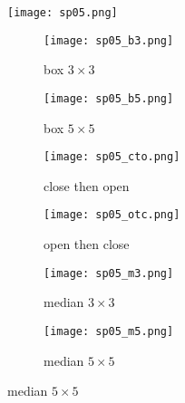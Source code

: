 \documentclass{article}
\begin{document}
\begin{figure}[ht]
    \centering
    \texttt{[image: sp05.png]}
    \caption{salt and pepper 0.05}
    \label{fig:top_image}

    \begin{subfigure}{0.3\textwidth}
        \texttt{[image: sp05\_b3.png]}
        \caption{box $3 \times 3$}
        \label{fig:sub1}
    \end{subfigure}
    \begin{subfigure}{0.3\textwidth}
        \texttt{[image: sp05\_b5.png]}
        \caption{box $5 \times 5$}
        \label{fig:sub2}
    \end{subfigure}

    \begin{subfigure}{0.3\textwidth}
        \texttt{[image: sp05\_cto.png]}
        \caption{close then open}
        \label{fig:sub3}
    \end{subfigure}%
    \begin{subfigure}{0.3\textwidth}
        \texttt{[image: sp05\_otc.png]}
        \caption{open then close}
        \label{fig:sub4}
    \end{subfigure}

    \begin{subfigure}{0.3\textwidth}
        \texttt{[image: sp05\_m3.png]}
        \caption{median $3 \times 3$}
        \label{fig:sub5}
    \end{subfigure}%
    \begin{subfigure}{0.3\textwidth}
        \texttt{[image: sp05\_m5.png]}
        \caption{median $5 \times 5$}
        \label{fig:sub6}
    \end{subfigure}

\end{figure}
\newpage
\end{document}
